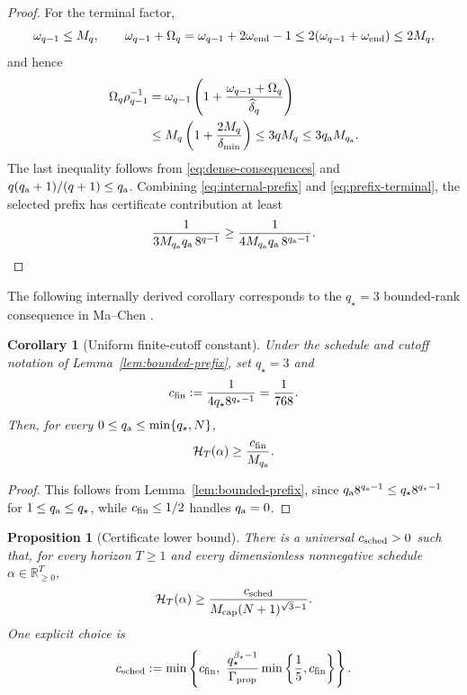 \documentclass[11pt]{article}
\newtheorem{proposition}[theorem]{Proposition}
\newtheorem{corollary}[theorem]{Corollary}
\theoremstyle{definition}
\theoremstyle{remark}
\newcommand{\R}{\mathbb{R}}
\newcommand{\cert}{\mathcal{H}}
\newcommand{\rankmass}{M}
\newcommand{\criticalexp}{\beta_{\star}}
\newcommand{\rankcut}{q_{\star}}
\newcommand{\propconst}{\Gamma_{\mathrm{prop}}}
\begin{document}
\begin{proof}
For the terminal factor,
\[
 \omega_{q-1}\le\rankmass_q,
 \qquad
 \omega_{q-1}+\Omega_q
 =\omega_{q-1}+2\omega_{\rm end}-1
 \le2(\omega_{q-1}+\omega_{\rm end})\le2\rankmass_q,
\]
and hence
\begin{equation}
\begin{aligned}
 \Omega_q\rho_{q-1}^{-1}
 &=\omega_{q-1}
   \left(1+\frac{\omega_{q-1}+\Omega_q}{\widehat\delta_q}\right)\\
 &\le\rankmass_q
   \left(1+\frac{2\rankmass_q}{\delta_{\min}}\right)
 \le3q\rankmass_q
 \le3q_{\rm a}\rankmass_{q_{\rm a}}.
\end{aligned}
\label{eq:prefix-terminal}
\end{equation}
The last inequality follows from \eqref{eq:dense-consequences} and
\(q(q_{\rm a}+1)/(q+1)\le q_{\rm a}\).  Combining
\eqref{eq:internal-prefix} and \eqref{eq:prefix-terminal}, the selected
prefix has certificate contribution at least
\[
 \frac1{3\rankmass_{q_{\rm a}}q_{\rm a}\,8^{q-1}}
 \ge\frac1{4\rankmass_{q_{\rm a}}q_{\rm a}\,8^{q_{\rm a}-1}}.
\]
\end{proof}

The following internally derived corollary corresponds to the
\(\rankcut=3\) bounded-rank consequence in Ma--Chen
\cite[Lemma~6.5]{machen2026}.
\begin{corollary}[Uniform finite-cutoff constant]
\label{cor:bounded-rank}
Under the schedule and cutoff notation of
Lemma~\ref{lem:bounded-prefix}, set \(\rankcut=3\) and
\begin{equation}
 c_{\rm fin}
 :=\frac1{4\rankcut8^{\rankcut-1}}=\frac1{768}.
 \label{eq:cQ}
\end{equation}
Then, for every \(0\le q_{\rm a}\le\min\{\rankcut,N\}\),
\begin{equation}
  \cert_T(\alpha)\ge\frac{c_{\rm fin}}{\rankmass_{q_{\rm a}}}.
  \label{eq:bounded-rank}
\end{equation}
\end{corollary}

\begin{proof}
This follows from Lemma~\ref{lem:bounded-prefix}, since
\(q_{\rm a}8^{q_{\rm a}-1}\le
\rankcut8^{\rankcut-1}\) for \(1\le q_{\rm a}\le\rankcut\), while
\(c_{\rm fin}\le1/2\) handles \(q_{\rm a}=0\).
\end{proof}

\begin{proposition}[Certificate lower bound]
\label{prop:schedule-bound}
There is a universal \(c_{\rm sched}>0\) such that, for every horizon
\(T\ge1\) and every dimensionless nonnegative schedule
\(\alpha\in\R_{\ge0}^T\),
\begin{equation}
 \cert_T(\alpha)
 \ge\frac{c_{\rm sched}}
          {\rankmass_{\mathrm{cap}}(N+1)^{\sqrt3-1}}.
 \label{eq:schedule-bound}
\end{equation}
One explicit choice is
\begin{equation}
 c_{\rm sched}
 :=
 \min\left\{
 c_{\rm fin},\
 \frac{\rankcut^{\criticalexp-1}}{\propconst}
 \min\left\{\frac15,c_{\rm fin}\right\}
 \right\}.
 \label{eq:csch}
\end{equation}
\end{proposition}
\end{document}
